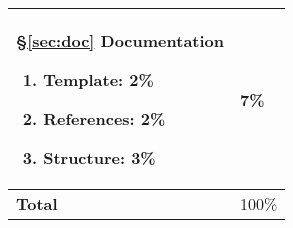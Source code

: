 \begin{longtable}{| p{120mm} | p{10mm} |}
\S\ref{sec:doc} Documentation
\begin{enumerate}
\item {\bf Template:} 2\%
\item {\bf References:} 2\%
\item {\bf Structure:} 3\%
\end{enumerate}
& 7\% \\ \hline \hline

{\bf Total} & 100\% \\ \hline

%



\end{longtable}

